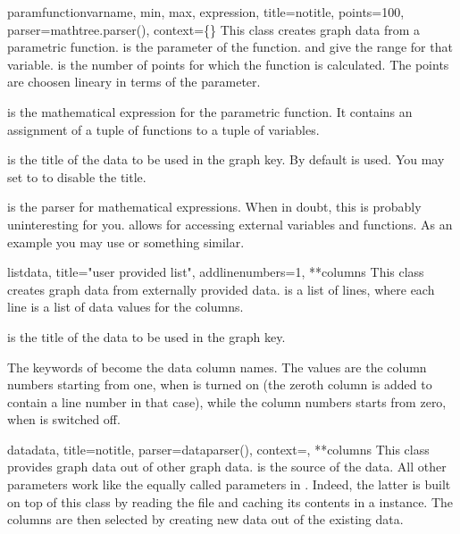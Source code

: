 \begin{classdesc}{paramfunction}{varname, min, max, expression,
                                 title=notitle, points=100,
                                 parser=mathtree.parser(),
                                 context=\{\}}
  This class creates graph data from a parametric function.
   is the parameter of the function.  and
   give the range for that variable.  is the
  number of points for which the function is calculated. The points
  are choosen lineary in terms of the parameter.

   is the mathematical expression for the parametric
  function. It contains an assignment of a tuple of functions to a
  tuple of variables.

   is the title of the data to be used in the graph key. By
  default  is used. You may set  to
   to disable the title.

   is the parser for mathematical expressions. When in
  doubt, this is probably uninteresting for you.  allows
  for accessing external variables and functions. As an example you
  may use  or something similar.
\end{classdesc}

\begin{classdesc}{list}{data, title="user provided list",
                        addlinenumbers=1, **columns}
  This class creates graph data from externally provided data.
   is a list of lines, where each line is a list of data
  values for the columns.

   is the title of the data to be used in the graph key.

  The keywords of  become the data column names. The
  values are the column numbers starting from one, when
   is turned on (the zeroth column is added to
  contain a line number in that case), while the column numbers starts
  from zero, when  is switched off.
\end{classdesc}

\begin{classdesc}{data}{data, title=notitle, parser=dataparser(),
                        context={}, **columns}
  This class provides graph data out of other graph data. 
  is the source of the data. All other parameters work like the equally
  called parameters in . Indeed, the latter is
  built on top of this class by reading the file and caching its
  contents in a  instance. The columns are then
  selected by creating new data out of the existing data.
\end{classdesc}

